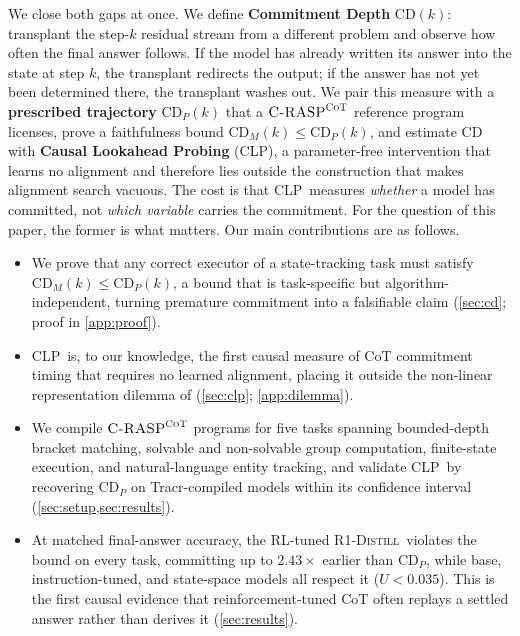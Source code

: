 \documentclass[11pt]{article}
\newcommand{\CD}{\mathrm{CD}}
\newcommand{\CDP}{\mathrm{CD}_{P}}
\newcommand{\CDM}{\mathrm{CD}_{M}}
\newcommand{\stepk}{k}
\newcommand{\CLP}{\textsc{CLP}}
\newcommand{\CRASPCoT}{\textsc{C-RASP}^{\textsc{CoT}}}
\newcommand{\Rdistill}{\textsc{R1-Distill}}
\begin{document}
We close both gaps at once. We define \textbf{Commitment Depth}
$\CD(\stepk)$: transplant the step-$\stepk$ residual stream from a different
problem and observe how often the final answer follows. If the model has already
written its answer into the state at step $\stepk$, the transplant redirects the
output; if the answer has not yet been determined there, the transplant washes
out. We pair this measure with a \textbf{prescribed trajectory}
$\CDP(\stepk)$ that a $\CRASPCoT$ reference program licenses, prove a
faithfulness bound $\CDM(\stepk)\le\CDP(\stepk)$, and estimate $\CD$ with
\textbf{Causal Lookahead Probing} (\CLP), a parameter-free intervention that
learns no alignment and therefore lies outside the construction that makes
alignment search vacuous. The cost is that \CLP\ measures \emph{whether} a
model has committed, not \emph{which variable} carries the commitment. For the
question of this paper, the former is what matters. Our main contributions are
as follows.
\begin{itemize}[leftmargin=*,topsep=2pt,itemsep=2pt]

\item We prove that any correct executor of a state-tracking task must satisfy
$\CDM(\stepk)\le\CDP(\stepk)$, a bound that is task-specific but
algorithm-independent, turning premature commitment into a falsifiable claim
(\cref{sec:cd}; proof in \cref{app:proof}).

\item \CLP\ is, to our knowledge, the first causal measure of CoT commitment
timing that requires no learned alignment, placing it outside the non-linear
representation dilemma of \citet{sutter2025nonlinear} (\cref{sec:clp};
\cref{app:dilemma}).

\item We compile $\CRASPCoT$ programs for five tasks spanning bounded-depth
bracket matching, solvable and non-solvable group computation, finite-state
execution, and natural-language entity tracking, and validate \CLP\ by
recovering $\CDP$ on Tracr-compiled models within its confidence interval
(\cref{sec:setup,sec:results}).

\item At matched final-answer accuracy, the RL-tuned \Rdistill\ violates the
bound on every task, committing up to $2.43\times$ earlier than $\CDP$, while
base, instruction-tuned, and state-space models all respect it ($U<0.035$).
This is the first causal evidence that reinforcement-tuned CoT often replays a
settled answer rather than derives it (\cref{sec:results}).

\end{itemize}
\end{document}
